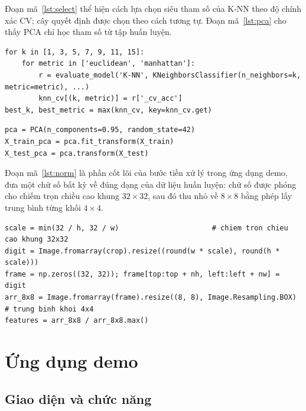 \documentclass[a4paper,oneside]{report}
\begin{document}
Đoạn mã~\ref{lst:select} thể hiện cách lựa chọn siêu tham số của K-NN theo độ chính xác CV; cây quyết định được
chọn theo cách tương tự. Đoạn mã~\ref{lst:pca} cho thấy PCA chỉ học tham số từ tập huấn luyện.

\begin{lstlisting}[caption={Chọn siêu tham số theo kiểm định chéo}, label={lst:select}]
for k in [1, 3, 5, 7, 9, 11, 15]:
    for metric in ['euclidean', 'manhattan']:
        r = evaluate_model('K-NN', KNeighborsClassifier(n_neighbors=k, metric=metric), ...)
        knn_cv[(k, metric)] = r['_cv_acc']
best_k, best_metric = max(knn_cv, key=knn_cv.get)
\end{lstlisting}

\begin{lstlisting}[caption={PCA chỉ học trên tập huấn luyện}, label={lst:pca}]
pca = PCA(n_components=0.95, random_state=42)
X_train_pca = pca.fit_transform(X_train)
X_test_pca = pca.transform(X_test)
\end{lstlisting}

Đoạn mã~\ref{lst:norm} là phần cốt lõi của bước tiền xử lý trong ứng dụng demo, đưa một chữ số bất kỳ về đúng dạng
của dữ liệu huấn luyện: chữ số được phóng cho chiếm trọn chiều cao khung $32 \times 32$, sau đó thu nhỏ về
$8 \times 8$ bằng phép lấy trung bình từng khối $4 \times 4$.

\begin{lstlisting}[caption={Chuẩn hóa một chữ số về dạng dữ liệu huấn luyện}, label={lst:norm}]
scale = min(32 / h, 32 / w)                      # chiem tron chieu cao khung 32x32
digit = Image.fromarray(crop).resize((round(w * scale), round(h * scale)))
frame = np.zeros((32, 32)); frame[top:top + nh, left:left + nw] = digit
arr_8x8 = Image.fromarray(frame).resize((8, 8), Image.Resampling.BOX)   # trung binh khoi 4x4
features = arr_8x8 / arr_8x8.max()
\end{lstlisting}

\section{Ứng dụng demo}
\label{sec:demo}

\subsection{Giao diện và chức năng}
\end{document}
